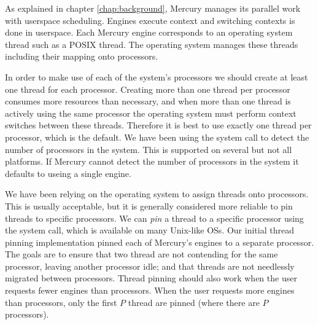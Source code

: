 

As explained in chapter \ref{chap:background},
Mercury manages its parallel work with userspace scheduling.
Engines execute context and switching contexts is done in userspace.
Each Mercury engine corresponds to an operating system thread such as a
POSIX thread\cite{butenhof1997:pthreads}.
The operating system manages these threads including their mapping onto
processors.


In order to make use of each of the system's processors we should create at
least one thread for each processor.
Creating more than one thread per processor consumes more resources
than necessary,
and when more than one thread is actively using the same processor the
operating system must perform context switches between these threads.
Therefore it is best to use exactly one thread per processor,
which is the default.
We have been using the  system call to detect the number of
processors in the system.
This is supported on several but not all platforms.
If Mercury cannot detect the number of processors in the system it defaults 
to useing a single engine.

We have been relying on the operating system to assign threads onto
processors.
This is usually acceptable,
but it is generally considered more reliable to pin threads to specific
processors.
We can \emph{pin} a thread to a specific processor using the
 system call,
which is available on many Unix-like OSs.
Our initial thread pinning implementation pinned each of Mercury's engines
to a separate processor.
The goals are to ensure that two thread are not contending for the same
processor, leaving another processor idle;
and that threads are not needlessly migrated between processors.
Thread pinning should also work when the user requests fewer engines
than processors.
When the user requests more engines than processors,
only the first $P$ thread are pinned (where there are $P$ processors).



